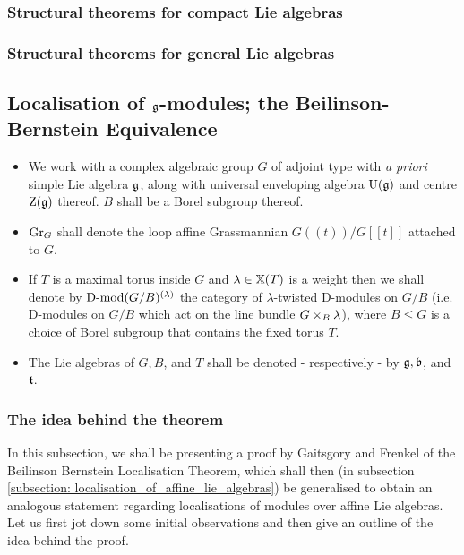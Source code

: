             \subsubsection{Structural theorems for compact Lie algebras}
            
            \subsubsection{Structural theorems for general Lie algebras}
    
        \subsection{Localisation of \texorpdfstring{$\mathfrak{g}$}{}-modules; the Beilinson-Bernstein Equivalence}
            \begin{convention} \label{conv: beilinson_bernstein_localisation_conventions}
                \noindent
                \begin{itemize}
                    \item We work with a complex algebraic group $G$ of adjoint type with \textit{a priori} simple Lie algebra $\mathfrak{g}$, along with universal enveloping algebra $\mathrm{U}(\mathfrak{g})$ and centre $\mathrm{Z}(\mathfrak{g})$ thereof. $B$ shall be a Borel subgroup thereof. 
                    \item $\mathrm{Gr}_G$ shall denote the loop affine Grassmannian $G(\!(t)\!)/G[\![t]\!]$ attached to $G$.
                    \item If $T$ is a maximal torus inside $G$ and $\lambda \in \mathbb{X}(T)$ is a weight then we shall denote by $\mathrm{D}\text{-}\mathrm{mod}(G/B)^{(\lambda)}$ the category of $\lambda$-twisted D-modules on $G/B$ (i.e. D-modules on $G/B$ which act on the line bundle $G \x_B \lambda$), where $B \leq G$ is a choice of Borel subgroup that contains the fixed torus $T$.
                    \item The Lie algebras of $G, B$, and $T$ shall be denoted - respectively - by $\mathfrak{g}, \mathfrak{b}$, and $\mathfrak{t}$.
                \end{itemize}
            \end{convention}
            
            \subsubsection{The idea behind the theorem}
                In this subsection, we shall be presenting a proof by Gaitsgory and Frenkel of the Beilinson Bernstein Localisation Theorem, which shall then (in subsection \ref{subsection: localisation_of_affine_lie_algebras}) be generalised to obtain an analogous statement regarding localisations of modules over affine Lie algebras. Let us first jot down some initial observations and then give an outline of the idea behind the proof.
                
